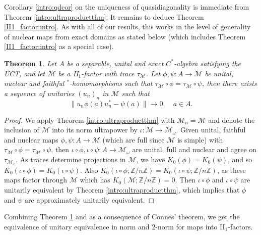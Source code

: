 \documentclass[reqno]{amsart}
\newtheorem{thm}{Theorem}[section]
\theoremstyle{definition}
\theoremstyle{remark}
\numberwithin{equation}{section}
\theoremstyle{definition}
\newcommand{\calM}{\mathcal{M}}
\begin{document}
Corollary \ref{intro:qdcor} on the uniqueness of quasidiagonality is immediate from Theorem \ref{intro:ultraproductthm}.  It remains to deduce Theorem \ref{II1_factor:intro}. As with all of our results, this works in the level of generality of nuclear maps from exact domains as stated below (which includes Theorem \ref{II1_factor:intro} as a special case).

\begin{thm}\label{II1_factor} 
Let $A$ be a separable, unital and exact $C^*$-algebra satisfying the UCT, and let $\calM$ be a II$_{1}$-factor with trace $\tau_{\calM}$. Let $\phi, \psi: A\rightarrow \calM$ be unital, nuclear and faithful $^*$-homomorphisms such that $\tau_{\calM} \circ \phi = \tau_{\calM} \circ \psi$, then there exists a sequence of unitaries $(u_{n})_{n}$ in $\calM$ such that 
\begin{equation}\label{II1_factor.1} 
\|u_n \phi(a)u_n^*-\psi(a)\|\to 0, \quad a\in A. 
\end{equation} 
\end{thm} 

\begin{proof} 
We apply Theorem \ref{intro:ultraproductthm} with $\mathcal M_n=\mathcal M$ and denote the inclusion of $\calM$ into its norm ultrapower by $\iota: \calM\rightarrow \mathcal M_\omega$. Given unital, faithful and nuclear maps $\phi,\psi:A\to\mathcal M$ (which are full since $\calM$ is simple) with $\tau_{\mathcal M}\circ\phi=\tau_{\mathcal M}\circ \psi$, then $\iota\circ \phi, \iota\circ \psi: A\rightarrow \calM_{\omega}$ are unital, full and nuclear and agree on $\tau_{\calM_{\omega}}$. As traces determine projections in $\mathcal M$, we have $K_0(\phi)=K_0(\psi)$, and so $K_0(\iota\circ\phi)=K_0(\iota\circ\psi)$. Also $K_0(\iota\circ\phi;\mathbb Z/n\mathbb Z)=K_0(\iota\circ\psi;\mathbb Z/n\mathbb Z)$, as these maps factor through $\mathcal M$ which has $K_0(\mathcal M;\mathbb Z/n\mathbb Z)=0$. Then $\iota\circ\phi$ and $\iota\circ\psi$ are unitarily equivalent by Theorem \ref{intro:ultraproductthm}, which implies that $\phi$ and $\psi$ are approximately unitarily equivalent.
\end{proof}

Combining Theorem \ref{II1_factor} and \cite[Proposition 1.1]{Schafhauser.Annals} as a consequence of Connes' theorem, we get the equivalence of unitary equivalence in norm and $2$-norm for maps into II$_{1}$-factors. 
\end{document}
